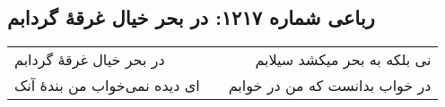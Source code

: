 \begin{center}
\section*{رباعی شماره ۱۲۱۷: در بحر خیال غرقهٔ گردابم}
\label{sec:1217}
\begin{longtable}{l p{0.5cm} r}
در بحر خیال غرقهٔ گردابم
&&
نی بلکه به بحر میکشد سیلابم
\\
ای دیده نمی‌خواب من بندهٔ آنک
&&
در خواب بدانست که من در خوابم
\\
\end{longtable}
\end{center}
